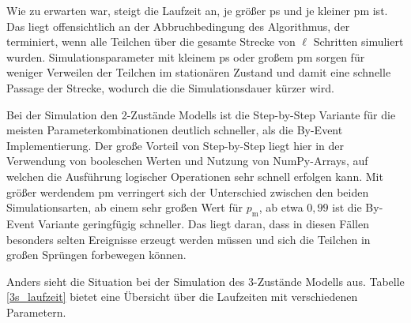 Wie zu erwarten war, steigt die Laufzeit an, je größer ps und je kleiner pm ist. Das liegt offensichtlich an der Abbruchbedingung des Algorithmus, der terminiert, wenn alle Teilchen über die gesamte Strecke von $\ell$ Schritten simuliert wurden. Simulationsparameter mit kleinem ps oder großem pm sorgen für weniger Verweilen der Teilchen im stationären Zustand und damit eine schnelle Passage der Strecke, wodurch die die Simulationsdauer kürzer wird. 

Bei der Simulation den 2-Zustände Modells ist die Step-by-Step Variante für die meisten Parameterkombinationen deutlich schneller, als die By-Event Implementierung. Der große Vorteil von Step-by-Step liegt hier in der Verwendung von booleschen Werten und Nutzung von NumPy-Arrays, auf welchen die Ausführung logischer Operationen sehr schnell erfolgen kann. 
Mit größer werdendem pm verringert sich der Unterschied zwischen den beiden Simulationsarten, ab einem sehr großen Wert für $p_{\text{m}}$, ab etwa $0,99$ ist die By-Event Variante geringfügig schneller. Das liegt daran, dass in diesen Fällen besonders selten Ereignisse erzeugt werden müssen und sich die Teilchen in großen Sprüngen forbewegen können. 

Anders sieht die Situation bei der Simulation des 3-Zustände Modells aus. Tabelle \ref{3s_laufzeit} bietet eine Übersicht über die Laufzeiten mit verschiedenen Parametern.

